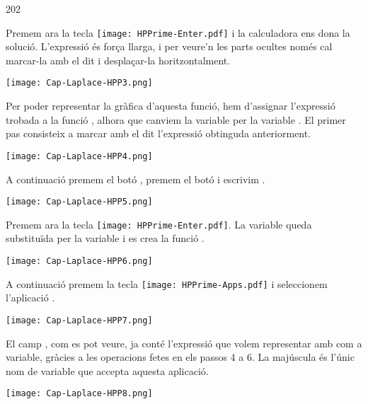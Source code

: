 \begin{exemple}
\begin{dingautolist}{202}
         \item Premem ara la tecla \texttt{[image: HPPrime-Enter.pdf]} i la calculadora ens dona la solució. L'expressió és força llarga, i per veure'n les parts ocultes només cal marcar-la amb el dit i desplaçar-la horitzontalment.

            \texttt{[image: Cap-Laplace-HPP3.png]}\vspace{5mm}

         \item Per  poder representar la gràfica d'aquesta funció, hem d'assignar l'expressió trobada a la  funció , alhora que canviem la variable  per la variable . El primer pas consisteix a marcar amb el dit l'expressió obtinguda anteriorment.

            \texttt{[image: Cap-Laplace-HPP4.png]}\vspace{5mm}

         \item A continuació premem el botó  , premem el botó  i  escrivim  .

             \texttt{[image: Cap-Laplace-HPP5.png]}\vspace{5mm}

         \item Premem ara la tecla \texttt{[image: HPPrime-Enter.pdf]}. La variable  queda substituïda per la variable  i es crea la funció .

          \texttt{[image: Cap-Laplace-HPP6.png]}\vspace{5mm}


         \item A continuació premem  la tecla \texttt{[image: HPPrime-Apps.pdf]} i seleccionem  l'aplicació .

            \texttt{[image: Cap-Laplace-HPP7.png]}\vspace{5mm}

          \item El camp  , com es pot veure, ja conté l'expressió que volem representar amb   com a variable, gràcies a les operacions fetes en els passos 4 a 6. La  majúscula és l'únic nom de variable que accepta aquesta aplicació.

            \texttt{[image: Cap-Laplace-HPP8.png]}\vspace{5mm}


\end{dingautolist}
\end{exemple}
